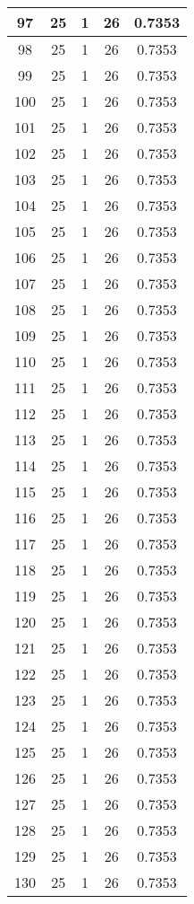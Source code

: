 \documentclass[letterpaper, 12pt]{article}
\begin{document}
\begin{longtable}{|c|c|c|c|c|}
\hline
97 & 25 & 1 & 26 & 0.7353 \\
\hline
98 & 25 & 1 & 26 & 0.7353 \\
\hline
99 & 25 & 1 & 26 & 0.7353 \\
\hline
100 & 25 & 1 & 26 & 0.7353 \\
\hline
101 & 25 & 1 & 26 & 0.7353 \\
\hline
102 & 25 & 1 & 26 & 0.7353 \\
\hline
103 & 25 & 1 & 26 & 0.7353 \\
\hline
104 & 25 & 1 & 26 & 0.7353 \\
\hline
105 & 25 & 1 & 26 & 0.7353 \\
\hline
106 & 25 & 1 & 26 & 0.7353 \\
\hline
107 & 25 & 1 & 26 & 0.7353 \\
\hline
108 & 25 & 1 & 26 & 0.7353 \\
\hline
109 & 25 & 1 & 26 & 0.7353 \\
\hline
110 & 25 & 1 & 26 & 0.7353 \\
\hline
111 & 25 & 1 & 26 & 0.7353 \\
\hline
112 & 25 & 1 & 26 & 0.7353 \\
\hline
113 & 25 & 1 & 26 & 0.7353 \\
\hline
114 & 25 & 1 & 26 & 0.7353 \\
\hline
115 & 25 & 1 & 26 & 0.7353 \\
\hline
116 & 25 & 1 & 26 & 0.7353 \\
\hline
117 & 25 & 1 & 26 & 0.7353 \\
\hline
118 & 25 & 1 & 26 & 0.7353 \\
\hline
119 & 25 & 1 & 26 & 0.7353 \\
\hline
120 & 25 & 1 & 26 & 0.7353 \\
\hline
121 & 25 & 1 & 26 & 0.7353 \\
\hline
122 & 25 & 1 & 26 & 0.7353 \\
\hline
123 & 25 & 1 & 26 & 0.7353 \\
\hline
124 & 25 & 1 & 26 & 0.7353 \\
\hline
125 & 25 & 1 & 26 & 0.7353 \\
\hline
126 & 25 & 1 & 26 & 0.7353 \\
\hline
127 & 25 & 1 & 26 & 0.7353 \\
\hline
128 & 25 & 1 & 26 & 0.7353 \\
\hline
129 & 25 & 1 & 26 & 0.7353 \\
\hline
130 & 25 & 1 & 26 & 0.7353 \\

\end{longtable}
\end{document}
